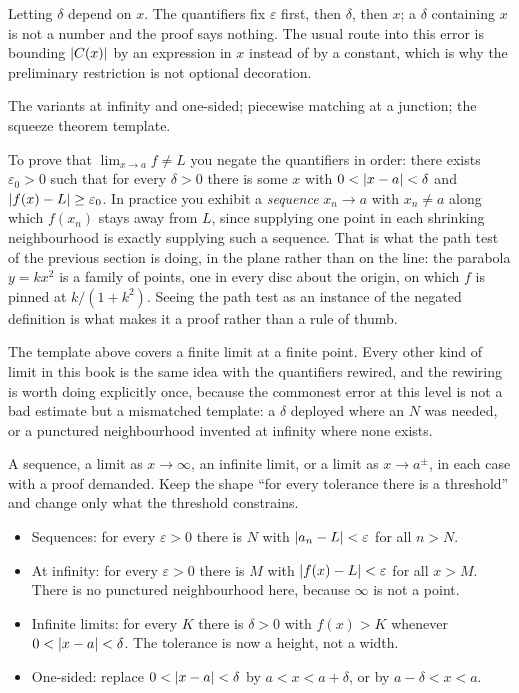 \begin{trap}
Letting $\delta$ depend on $x$. The quantifiers fix $\varepsilon$ first, then $\delta$, then $x$; a $\delta$ containing $x$ is not a number and the proof says nothing. The usual route into this error is bounding $\left\lvert C(x)\right\rvert$ by an expression in $x$ instead of by a constant, which is why the preliminary restriction is not optional decoration.
\end{trap}

\begin{seealsob}The variants at infinity and one-sided; piecewise matching at a junction; the squeeze theorem template.\end{seealsob}

\begin{keynote}
To prove that $\lim_{x\to a}f\neq L$ you negate the quantifiers in order: there exists $\varepsilon_0>0$ such that for every $\delta>0$ there is some $x$ with $0<\left\lvert x-a\right\rvert<\delta$ and $\left\lvert f(x)-L\right\rvert\geq\varepsilon_0$. In practice you exhibit a \emph{sequence} $x_n\to a$ with $x_n\neq a$ along which $f(x_n)$ stays away from $L$, since supplying one point in each shrinking neighbourhood is exactly supplying such a sequence. That is what the path test of the previous section is doing, in the plane rather than on the line: the parabola $y=kx^{2}$ is a family of points, one in every disc about the origin, on which $f$ is pinned at $k/(1+k^{2})$. Seeing the path test as an instance of the negated definition is what makes it a proof rather than a rule of thumb.
\end{keynote}

The template above covers a finite limit at a finite point. Every other kind of limit in this book is the same idea with the quantifiers rewired, and the rewiring is worth doing explicitly once, because the commonest error at this level is not a bad estimate but a mismatched template: a $\delta$ deployed where an $N$ was needed, or a punctured neighbourhood invented at infinity where none exists.

\cue A sequence, a limit as $x\to\infty$, an infinite limit, or a limit as $x\to a^{\pm}$, in each case with a proof demanded.
\method Keep the shape ``for every tolerance there is a threshold'' and change only what the threshold constrains.
\begin{itemize}
\item Sequences: for every $\varepsilon>0$ there is $N$ with $\left\lvert a_n-L\right\rvert<\varepsilon$ for all $n>N$.
\item At infinity: for every $\varepsilon>0$ there is $M$ with $\left\lvert f(x)-L\right\rvert<\varepsilon$ for all $x>M$. There is no punctured neighbourhood here, because $\infty$ is not a point.
\item Infinite limits: for every $K$ there is $\delta>0$ with $f(x)>K$ whenever $0<\left\lvert x-a\right\rvert<\delta$. The tolerance is now a height, not a width.
\item One-sided: replace $0<\left\lvert x-a\right\rvert<\delta$ by $a<x<a+\delta$, or by $a-\delta<x<a$.
\end{itemize}

